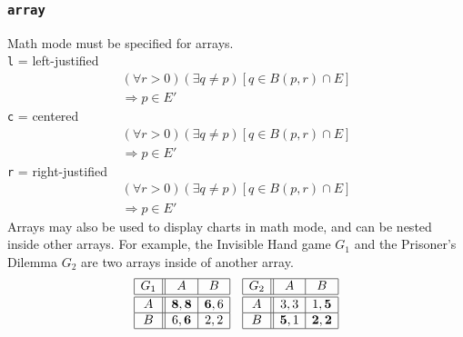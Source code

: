 \documentclass{article} 		%
\begin{document}
\subsubsection{\texttt{array}} \label{subsubsec:array}
Math mode must be specified for arrays. \\
\texttt{l} = left-justified
\[
	\begin{array}{l} 
		(\forall r > 0)(\exists q \neq p)[q \in B(p,r) \cap E] \\
		\Rightarrow p \in E'
	\end{array}
\]
\texttt{c} = centered
\[
	\begin{array}{c}
		(\forall r > 0)(\exists q \neq p)[q \in B(p,r) \cap E] \\
		\Rightarrow p \in E'
	\end{array}
\]
\texttt{r} = right-justified
\[
	\begin{array}{r}
		(\forall r > 0)(\exists q \neq p)[q \in B(p,r) \cap E] \\
		\Rightarrow p \in E'
	\end{array}
\]
Arrays may also be used to display charts in math mode, and can be nested inside other arrays. For example, the Invisible Hand game $G_1$ and the Prisoner's Dilemma $G_2$ are two arrays inside of another array. 
\[
	\begin{array}{lr}
		\begin{array}{|c||c|c|}
			\hline
			G_1 & A & B \\ \hline\hline
			A & \mathbf{8},\mathbf{8} & \mathbf{6},6 \\ \hline
			B & 6,\mathbf{6} & 2,2 \\ \hline
		\end{array}
		&
		\begin{array}{|c||c|c|}
			\hline
			G_2 & A & B \\ \hline\hline
			A & 3,3 & 1, \mathbf{5} \\ \hline
			B & \mathbf{5},1 & \mathbf{2},\mathbf{2} \\ \hline
		\end{array}
	\end{array}
\]
\end{document}

